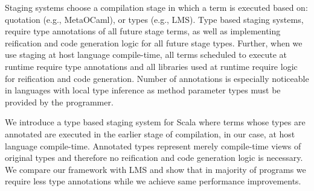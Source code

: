Staging systems choose a compilation stage in which a term is executed based on: quotation (e.g., MetaOCaml), or types (e.g., LMS). Type based staging systems, require type annotations of all future stage terms, as well as implementing reification and code generation logic for all future stage types. Further, when we use staging at host language compile-time, all terms scheduled to execute at runtime require type annotations and all libraries used at runtime require logic for reification and code generation. Number of annotations is especially noticeable in languages with local type inference as method parameter types must be provided by the programmer.

We introduce a type based staging system for Scala where terms whose types are annotated are executed in the earlier stage of compilation, in our case, at host language compile-time. Annotated types represent merely compile-time views of original types and therefore no reification and code generation logic is necessary. We compare our framework with LMS and show that in majority of programs we require less type annotations while we achieve same performance improvements.
